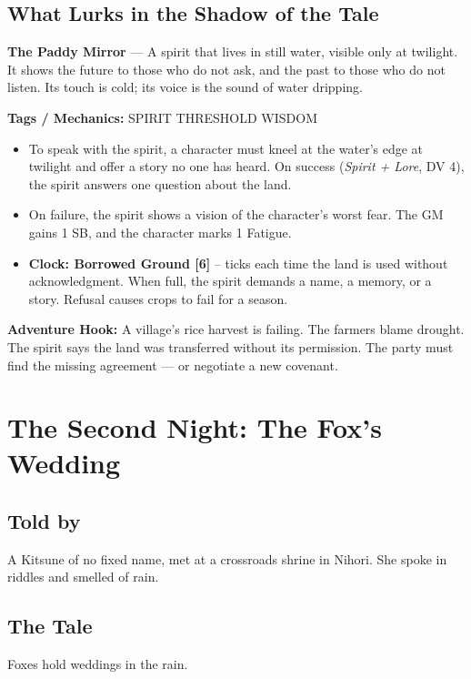 \documentclass[10pt,twoside]{book}
\newcommand{\tag}[1]{\textsc{#1}}
\begin{document}
\section*{What Lurks in the Shadow of the Tale}
\begin{infobox}
\textbf{The Paddy Mirror} --- A spirit that lives in still water, visible only at twilight. It shows the future to those who do not ask, and the past to those who do not listen. Its touch is cold; its voice is the sound of water dripping.

\textbf{Tags / Mechanics:} \tag{SPIRIT} \tag{THRESHOLD} \tag{WISDOM}

\begin{itemize}
\item To speak with the spirit, a character must kneel at the water's edge at twilight and offer a story no one has heard. On success (\textit{Spirit + Lore}, DV 4), the spirit answers one question about the land.
\item On failure, the spirit shows a vision of the character's worst fear. The GM gains 1 SB, and the character marks 1 Fatigue.
\item \textbf{Clock: Borrowed Ground [6]} -- ticks each time the land is used without acknowledgment. When full, the spirit demands a name, a memory, or a story. Refusal causes crops to fail for a season.
\end{itemize}

\textbf{Adventure Hook:} A village's rice harvest is failing. The farmers blame drought. The spirit says the land was transferred without its permission. The party must find the missing agreement --- or negotiate a new covenant.
\end{infobox}

\chapter{The Second Night: The Fox's Wedding}

\section*{Told by}
A Kitsune of no fixed name, met at a crossroads shrine in Nihori. She spoke in riddles and smelled of rain.

\section*{The Tale}
Foxes hold weddings in the rain.
\end{document}
